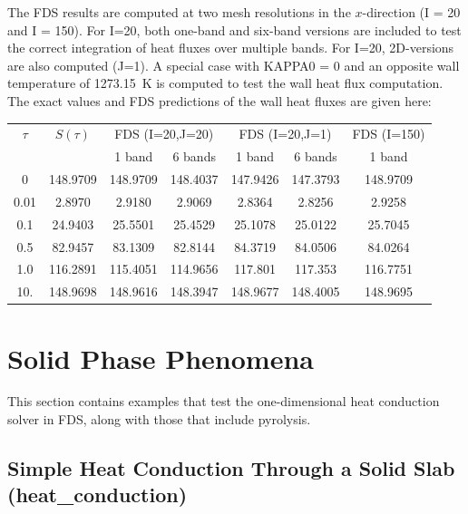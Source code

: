 \documentclass[11pt]{book}
\begin{document}
The FDS results are computed at two mesh resolutions in the
$x$-direction (I = 20 and I = 150). For I=20, both one-band and
six-band versions are included to test the correct integration of heat
fluxes over multiple bands. For I=20, 2D-versions are also computed
(J=1). A special case with {\ct KAPPA0} = 0 and
an opposite wall temperature of 1273.15~K is computed to test the wall
heat flux computation. The exact values and FDS predictions of the
wall heat fluxes are given here:
\begin{center}
\begin{tabular}{|c|c|c|c|c|c|c|} \hline
$\tau$ & $S(\tau)$ & \multicolumn{2}{c}{FDS (I=20,J=20)}
           & \multicolumn{2}{c}{FDS (I=20,J=1)}
                   & FDS (I=150) \\
     &          & 1 band  & 6 bands   & 1 band & 6 bands & 1 band \\
                            \hline\hline
0    & 148.9709 & 148.9709&  148.4037 & 147.9426 &147.3793 &148.9709 \\
0.01 & 2.8970   & 2.9180  &  2.9069   & 2.8364   &2.8256   &2.9258   \\
0.1  & 24.9403  & 25.5501 &  25.4529  & 25.1078  &25.0122  &25.7045  \\
0.5  & 82.9457  & 83.1309 &  82.8144  & 84.3719  &84.0506  &84.0264  \\
1.0  & 116.2891 & 115.4051&  114.9656 & 117.801  &117.353  &116.7751 \\
10.  & 148.9698 & 148.9616&  148.3947 & 148.9677 &148.4005 &148.9695 \\ \hline
\end{tabular}
\end{center}



\clearpage

\section{Solid Phase Phenomena}

This section contains examples that test the one-dimensional heat conduction solver in FDS, along with those that include
pyrolysis.


\subsection{Simple Heat Conduction Through a Solid Slab ({\bf heat\_conduction}) }
\end{document}
